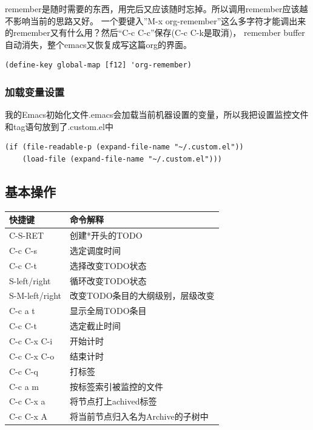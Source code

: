 \documentclass[11pt]{article}
\begin{document}
    remember是随时需要的东西，用完后又应该随时忘掉。所以调用remember应该越不影响当前的思路又好。
    一个要键入”M-x org-remember”这么多字符才能调出来的remember又有什么用？然后“C-c C-c”保存(C-c C-k是取消)，
    remember buffer自动消失，整个emacs又恢复成写这篇org的界面。

\begin{verbatim}
(define-key global-map [f12] 'org-remember)
\end{verbatim}
\subsubsection{加载变量设置}
\label{sec-7-2-5}

    我的Emacs初始化文件.emacs会加载当前机器设置的变量，所以我把设置监控文件和tag语句放到了.custom.el中

\begin{verbatim}
(if (file-readable-p (expand-file-name "~/.custom.el"))
    (load-file (expand-file-name "~/.custom.el")))
\end{verbatim}
    
\subsection{基本操作}
\label{sec-7-3}


\begin{center}
\begin{tabular}{ll}
 快捷键          &  命令解释                           \\
\hline
 C-S-RET         &  创建*开头的TODO                    \\
 C-c C-s         &  选定调度时间                       \\
 C-c C-t         &  选择改变TODO状态                   \\
 S-left/right    &  循环改变TODO状态                   \\
 S-M-left/right  &  改变TODO条目的大纲级别，层级改变   \\
 C-c a t         &  显示全局TODO条目                   \\
 C-c C-t         &  选定截止时间                       \\
 C-c C-x C-i     &  开始计时                           \\
 C-c C-x C-o     &  结束计时                           \\
 C-c C-q         &  打标签                             \\
 C-c a m         &  按标签索引被监控的文件             \\
 C-c C-x a       &  将节点打上achived标签              \\
 C-c C-x A       &  将当前节点归入名为Archive的子树中  \\
\end{tabular}
\end{center}
\end{document}
